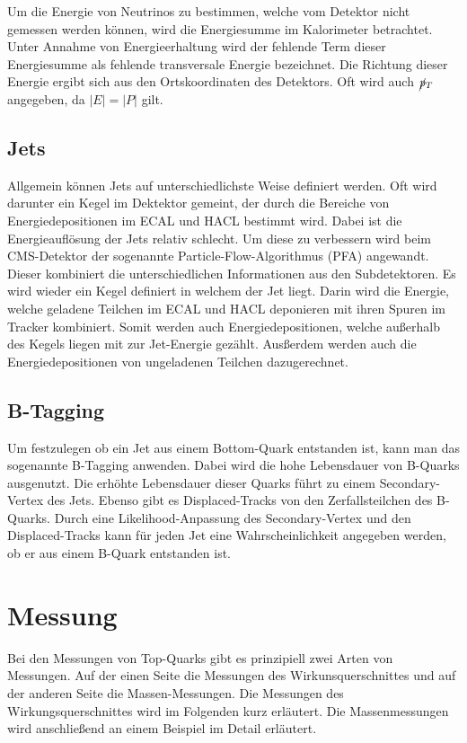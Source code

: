 \documentclass[a4paper]{article}
\begin{document}
Um die Energie von Neutrinos zu bestimmen, welche vom Detektor nicht gemessen werden können, wird die Energiesumme im Kalorimeter betrachtet. Unter Annahme von Energieerhaltung wird der fehlende Term dieser Energiesumme als fehlende transversale Energie bezeichnet. Die Richtung dieser Energie ergibt sich aus den Ortskoordinaten des Detektors. Oft wird auch $\cancel{\it{p}}_{T}$ angegeben, da $|E| = |P|$ gilt.

\subsection{Jets}
Allgemein können Jets auf unterschiedlichste Weise definiert werden. Oft wird darunter ein Kegel im Dektektor gemeint, der durch die Bereiche von Energiedepositionen im ECAL und HACL bestimmt wird. Dabei ist die Energieauflösung der Jets relativ schlecht. Um diese zu verbessern wird beim CMS-Detektor der sogenannte Particle-Flow-Algorithmus (PFA) angewandt. Dieser kombiniert die unterschiedlichen Informationen aus den Subdetektoren. Es wird wieder ein Kegel definiert in welchem der Jet liegt. Darin wird die Energie, welche geladene Teilchen im ECAL und HACL deponieren mit ihren Spuren im Tracker kombiniert. Somit werden auch Energiedepositionen, welche außerhalb des Kegels liegen mit zur Jet-Energie gezählt. Ausßerdem werden auch die Energiedepositionen von ungeladenen Teilchen dazugerechnet.

\subsection{B-Tagging}
Um festzulegen ob ein Jet aus einem Bottom-Quark entstanden ist, kann man das sogenannte B-Tagging anwenden. Dabei wird die hohe Lebensdauer von B-Quarks ausgenutzt. Die erhöhte Lebensdauer dieser Quarks führt zu einem Secondary-Vertex des Jets. Ebenso gibt es Displaced-Tracks von den Zerfallsteilchen des B-Quarks. Durch eine Likelihood-Anpassung des Secondary-Vertex und den Displaced-Tracks kann für jeden Jet eine Wahrscheinlichkeit angegeben werden, ob er aus einem B-Quark entstanden ist.

\section{Messung}
Bei den Messungen von Top-Quarks gibt es prinzipiell zwei Arten von Messungen. Auf der einen Seite die Messungen des Wirkunsquerschnittes und auf der anderen Seite die Massen-Messungen. Die Messungen des Wirkungsquerschnittes wird im Folgenden kurz erläutert. Die Massenmessungen wird anschließend an einem Beispiel im Detail erläutert.
\end{document}
